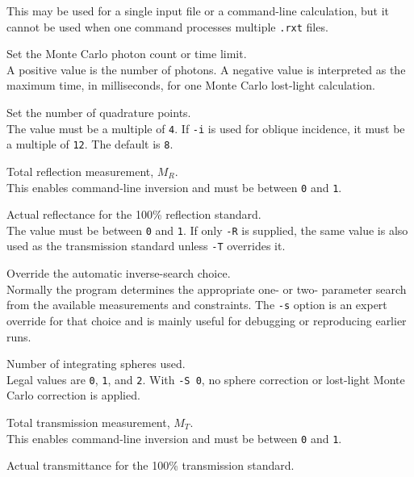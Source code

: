 \documentclass{article}
\begin{document}
\begin{description}
                 This may be used for a single input file or a command-line calculation, but it cannot
                 be used when one command processes multiple \texttt{.rxt} files.
    \item[-p \#] Set the Monte Carlo photon count or time limit.\\[1mm]
                 A positive value is the number of photons.  A negative value is interpreted as the
                 maximum time, in milliseconds, for one Monte Carlo lost-light calculation.
    \item[-q \#] Set the number of quadrature points.\\[1mm]
                 The value must be a multiple of \texttt{4}.  If \texttt{-i} is used for oblique
                 incidence, it must be a multiple of \texttt{12}.  The default is \texttt{8}.
    \item[-r \#] Total reflection measurement, $M_R$.\\[1mm]
                 This enables command-line inversion and must be between \texttt{0} and \texttt{1}.
    \item[-R \#] Actual reflectance for the 100\% reflection standard.\\[1mm]
                 The value must be between \texttt{0} and \texttt{1}.  If only \texttt{-R} is supplied,
                 the same value is also used as the transmission standard unless \texttt{-T} overrides it.
    \item[-s \#] Override the automatic inverse-search choice.\\[1mm]
                 Normally the program determines the appropriate one- or two-
                 parameter search from the available measurements and constraints.
                 The \texttt{-s} option is an expert override for that choice and
                 is mainly useful for debugging or reproducing earlier runs.
    \item[-S \#] Number of integrating spheres used.\\[1mm]
                 Legal values are \texttt{0}, \texttt{1}, and \texttt{2}.  With \texttt{-S 0},
                 no sphere correction or lost-light Monte Carlo correction is applied.
    \item[-t \#] Total transmission measurement, $M_T$.\\[1mm]
                 This enables command-line inversion and must be between \texttt{0} and \texttt{1}.
    \item[-T \#] Actual transmittance for the 100\% transmission standard.\\[1mm]

\end{description}
\end{document}
